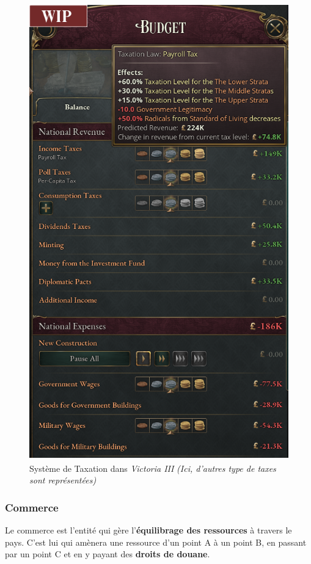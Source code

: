 \documentclass{article}
\def\reg{\small{\textsuperscript{\textregistered}}}
\begin{document}
                \begin{figure}[h]
                    \centering
                        \includegraphics[scale=0.4]{image_vic3_taxes.png}
                        \caption{Système de Taxation dans \textit{Victoria III\reg} \textit{(Ici, d'autres type de taxes sont représentées)}}
                        \label{fig:x photosysteme}
                \end{figure}
       
            \subsubsection{Commerce}
                Le commerce est l'entité qui gère l'\textbf{équilibrage des ressources} à travers le pays. C'est lui qui amènera une ressource d'un point A à un point B, en passant par un point C et en y payant des \textbf{droits de douane}.        
\end{document}
